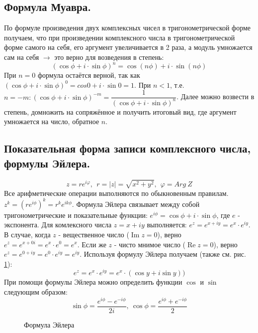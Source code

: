 \documentclass[a4paper,14pt]{article}
\DeclareMathOperator{\realpart}{\mathop{Re}}	%
\DeclareMathOperator{\imgpart}{\mathop{Im}} 	%
\begin{document}
\subsection{Формула Муавра.}
По формуле произведения двух комплексных чисел в тригонометрической форме получаем, что при произведении комплексного числа в тригонометрической форме самого на себя, его аргумент увеличивается в 2 раза, а модуль умножается сам на себя $\rightarrow$ это верно для возведения в степень:
\[\left(\cos\phi+i\cdot \sin \phi\right)^n=\cos{\left(n\phi\right)}+i\cdot \sin{\left(n\phi\right)}\]
\noindent При $n=0$ формула остаётся верной, так как $\left(\cos \phi+i\cdot \sin \phi\right)^0=cos0+i\cdot \sin 0=1$.
\noindent При $n<1$, т.е. $n=-m: \left(\cos\phi+i\cdot \sin \phi\right)^{-m}=\dfrac{1}{(\cos \phi + i \cdot \sin \phi)^n}$. Далее можно возвести в степень, домножить на сопряжённое и получить итоговый вид, где аргумент умножается на число, обратное $n$.
\subsection{Показательная форма записи комплексного числа, формулы Эйлера.}
\[z=re^{i\varphi},\ \ r=\left|z\right|=\sqrt{x^2+y^2},\ \ \varphi=Arg\ Z\]
Все арифметические операции выполняются по обыкновенным правилам. $z^k=\left(re^{i\phi}\right)^k=r^ke^{ik\phi}$.
Формула Эйлера связывает между собой тригонометрические и показательные функции: $e^{i\phi}=\cos\phi+i \cdot \sin \phi$, где $e$ - экспонента.
Для комлексного числа $z=x+iy$ выполняется: $e^z=e^{x+iy}=e^x \cdot e^{iy}$. В случае, когда $z$ - вещественное число ($\imgpart z = 0$), верно $e^z=e^{x+0i}=e^x \cdot e^0=e^x$. Если же $z$ - чисто мнимое число ($\realpart z = 0$), верно $e^z=e^{0+iy}=e^0 \cdot e^{iy}=e^{iy}$. Используя формулу Эйлера получаем (также см. рис. \ref{complex:graph:euler}):
\[e^z=e^x \cdot e^{iy}=e^x \cdot (\cos y + i \sin y))\]
При помощи формулы Эйлера можно определить функции $\cos$ и $\sin$ следующим образом:
\[\sin \phi=\frac{e^{i\phi}-e^{-i\phi}}{2i},\ \cos \phi=\frac{e^{i\phi}+e^{-i\phi}}{2}\]
\begin{figure}[h]
	\begin{center}
	\end{center} \caption{Формула Эйлера} \label{complex:graph:euler}
\end{figure}
\end{document}
